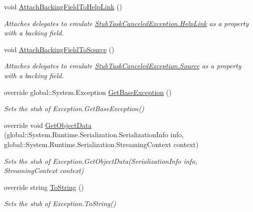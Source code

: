 \begin{DoxyCompactItemize}
void \hyperlink{class_system_1_1_threading_1_1_tasks_1_1_fakes_1_1_stub_task_canceled_exception_acafe1e7edee8c78b750441058b35a75f}{Attach\-Backing\-Field\-To\-Help\-Link} ()
\begin{DoxyCompactList}\small\item\em Attaches delegates to emulate \hyperlink{class_system_1_1_threading_1_1_tasks_1_1_fakes_1_1_stub_task_canceled_exception_a59476bdffe48e7c8bab1361bdab6149b}{Stub\-Task\-Canceled\-Exception.\-Help\-Link} as a property with a backing field.\end{DoxyCompactList}\item 
void \hyperlink{class_system_1_1_threading_1_1_tasks_1_1_fakes_1_1_stub_task_canceled_exception_ac8e30e59048aec1490f073c3d411f3ae}{Attach\-Backing\-Field\-To\-Source} ()
\begin{DoxyCompactList}\small\item\em Attaches delegates to emulate \hyperlink{class_system_1_1_threading_1_1_tasks_1_1_fakes_1_1_stub_task_canceled_exception_a88b3c9bb75bf336318bd4a8a370e7d7c}{Stub\-Task\-Canceled\-Exception.\-Source} as a property with a backing field.\end{DoxyCompactList}\item 
override global\-::\-System.\-Exception \hyperlink{class_system_1_1_threading_1_1_tasks_1_1_fakes_1_1_stub_task_canceled_exception_abe0a4f5fda6b1bd0225ace12d6b6f13a}{Get\-Base\-Exception} ()
\begin{DoxyCompactList}\small\item\em Sets the stub of Exception.\-Get\-Base\-Exception()\end{DoxyCompactList}\item 
override void \hyperlink{class_system_1_1_threading_1_1_tasks_1_1_fakes_1_1_stub_task_canceled_exception_ab456547b85dee84f2e2098e9ea8145ef}{Get\-Object\-Data} (global\-::\-System.\-Runtime.\-Serialization.\-Serialization\-Info info, global\-::\-System.\-Runtime.\-Serialization.\-Streaming\-Context context)
\begin{DoxyCompactList}\small\item\em Sets the stub of Exception.\-Get\-Object\-Data(\-Serialization\-Info info, Streaming\-Context context)\end{DoxyCompactList}\item 
override string \hyperlink{class_system_1_1_threading_1_1_tasks_1_1_fakes_1_1_stub_task_canceled_exception_a95158bed08af1a121f4bb4ddc4123404}{To\-String} ()
\begin{DoxyCompactList}\small\item\em Sets the stub of Exception.\-To\-String()\end{DoxyCompactList}\end{DoxyCompactItemize}
